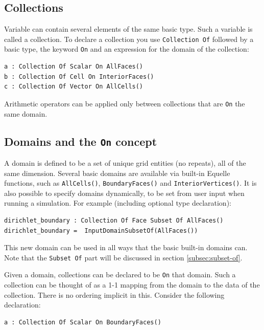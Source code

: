 \documentclass[11pt]{article}
\newcommand{\code}[1]{\texttt{#1}}
\begin{document}
\subsection{Collections}

Variable can contain several elements of the same basic type. Such a variable is called a
collection. To declare a collection you use \code{Collection Of} followed by a basic type,
the keyword \code{On} and an expression for the domain of the collection:

\begin{verbatim}
a : Collection Of Scalar On AllFaces()
b : Collection Of Cell On InteriorFaces()
c : Collection Of Vector On AllCells()
\end{verbatim}

Arithmetic operators can be applied only between collections that are \code{On} the same
domain.

\subsection{Domains and the \code{On} concept}
\label{subsec:domains-on}

A domain is defined to be a set of unique grid entities (no repeats), all of the same
dimension. Several basic domains are available via built-in Equelle functions, such as
\code{AllCells()}, \code{BoundaryFaces()} and \code{InteriorVertices()}. It is also
possible to specify domains dynamically, to be set from user input when running a
simulation. For example (including optional type declaration):

\begin{verbatim}
dirichlet_boundary : Collection Of Face Subset Of AllFaces()
dirichlet_boundary =  InputDomainSubsetOf(AllFaces())
\end{verbatim}

This new domain can be used in all ways that the basic built-in domains can. Note that the
\code{Subset Of} part will be discussed in section \ref{subsec:subset-of}.

Given a domain, collections can be declared to be \code{On} that domain. Such a collection
can be thought of as a 1-1 mapping from the domain to the data of the collection. There is
no ordering implicit in this. Consider the following declaration:

\begin{verbatim}
a : Collection Of Scalar On BoundaryFaces()
\end{verbatim}
\end{document}
